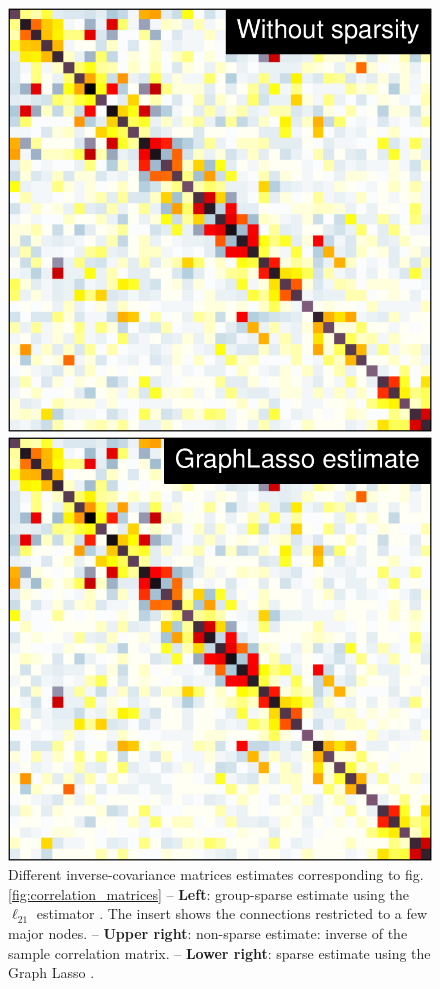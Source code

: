 \documentclass[5p]{elsarticle}
\begin{document}
\begin{figure}
\begin{minipage}{.33\linewidth}%
    \includegraphics[width=\linewidth]{group_emp_prec.pdf}%

    \includegraphics[width=\linewidth]{group_l1_prec.pdf}%
\end{minipage}%

\caption{
Different inverse-covariance matrices estimates corresponding to
fig.\,\ref{fig:correlation_matrices} -- \textbf{Left}: group-sparse estimate
using the $\ell_{21}$ estimator \cite{varoquaux2010c}.
The insert shows the
connections restricted to a few major nodes. -- \textbf{Upper
right}: non-sparse estimate: inverse of the sample correlation matrix. --
\textbf{Lower right}: sparse estimate using the Graph Lasso
\cite{friedman2008}.
\label{fig:icov_estimators}
}
\end{figure}
\end{document}
